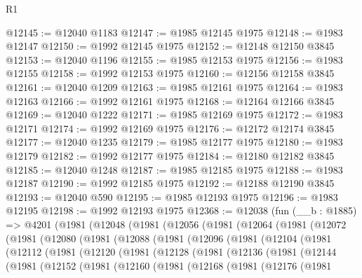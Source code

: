 \begin{lexlean}{R1}
\begin{coremodule}
@12145 := @12040 @1183
@12147 := @1985 @12145 @1975
@12148 := @1983 @12147
@12150 := @1992 @12145 @1975
@12152 := @12148 @12150 @3845
@12153 := @12040 @1196
@12155 := @1985 @12153 @1975
@12156 := @1983 @12155
@12158 := @1992 @12153 @1975
@12160 := @12156 @12158 @3845
@12161 := @12040 @1209
@12163 := @1985 @12161 @1975
@12164 := @1983 @12163
@12166 := @1992 @12161 @1975
@12168 := @12164 @12166 @3845
@12169 := @12040 @1222
@12171 := @1985 @12169 @1975
@12172 := @1983 @12171
@12174 := @1992 @12169 @1975
@12176 := @12172 @12174 @3845
@12177 := @12040 @1235
@12179 := @1985 @12177 @1975
@12180 := @1983 @12179
@12182 := @1992 @12177 @1975
@12184 := @12180 @12182 @3845
@12185 := @12040 @1248
@12187 := @1985 @12185 @1975
@12188 := @1983 @12187
@12190 := @1992 @12185 @1975
@12192 := @12188 @12190 @3845
@12193 := @12040 @590
@12195 := @1985 @12193 @1975
@12196 := @1983 @12195
@12198 := @1992 @12193 @1975
@12368 := @12038
    (fun (__b : @1885) =>
    @4201
      (@1981
        (@12048
          (@1981
            (@12056
              (@1981
                (@12064
                  (@1981
                    (@12072
                      (@1981
                        (@12080
                          (@1981
                            (@12088
                              (@1981
                                (@12096
                                  (@1981
                                    (@12104
                                      (@1981
                                        (@12112
                                          (@1981
                                            (@12120
                                              (@1981
                                                (@12128
                                                  (@1981
                                                    (@12136
                                                      (@1981
                                                        (@12144
                                                          (@1981
                                                            (@12152
                                                              (@1981
                                                                (@12160
                                                                  (@1981
                                                                    (@12168
                                                                      (@1981
                                                                        (@12176
                                                                          (@1981

\end{coremodule}
\end{lexlean}
